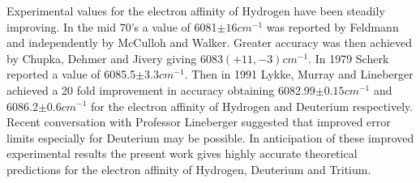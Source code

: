 \documentclass[12pt,thmsa]{article}
\begin{document}
Experimental values for the electron affinity of Hydrogen have been steadily
improving. In the mid 70's a value of 6081$\pm 16cm^{-1}$ was reported by
Feldmann\cite{Feldmann75} and independently by McCulloh and Walker\cite
{McCulloh74}. Greater accuracy was then achieved by Chupka, Dehmer and Jivery%
\cite{Chupka75} giving 6083$\left( +11,-3\right) cm^{-1}$. In 1979 Scherk%
\cite{Scherk79} reported a value of 6085.5$\pm 3.3cm^{-1}$. Then in 1991
Lykke, Murray and Lineberger\cite{Lykke91} achieved a 20 fold improvement in
accuracy obtaining 6082.99$\pm 0.15cm^{-1}$ and 6086.2$\pm 0.6cm^{-1}$ for
the electron affinity of Hydrogen and Deuterium respectively. Recent
conversation with Professor Lineberger suggested that improved error limits
especially for Deuterium may be possible. In anticipation of these improved
experimental results the present work gives highly accurate theoretical
predictions for the electron affinity of Hydrogen, Deuterium and Tritium.
\end{document}
